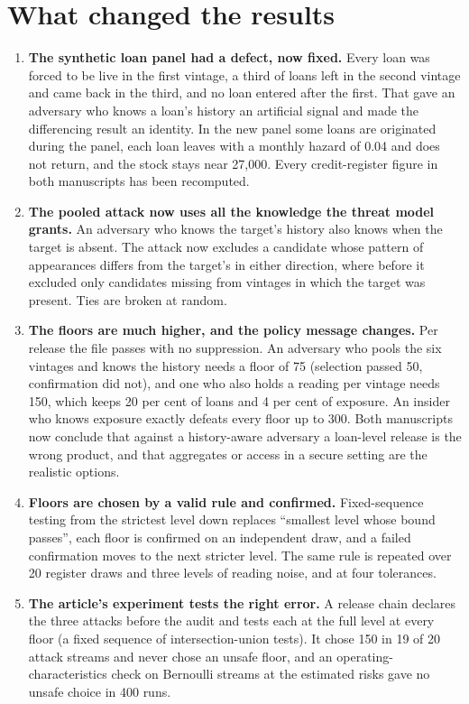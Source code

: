 \documentclass[11pt,a4paper]{article}
\begin{document}
\section*{What changed the results}
\begin{enumerate}
\item \textbf{The synthetic loan panel had a defect, now fixed.} Every loan was forced to be live in the first vintage, a third of loans left in the second vintage and came back in the third, and no loan entered after the first. That gave an adversary who knows a loan's history an artificial signal and made the differencing result an identity. In the new panel some loans are originated during the panel, each loan leaves with a monthly hazard of 0.04 and does not return, and the stock stays near 27,000. Every credit-register figure in both manuscripts has been recomputed.
\item \textbf{The pooled attack now uses all the knowledge the threat model grants.} An adversary who knows the target's history also knows when the target is absent. The attack now excludes a candidate whose pattern of appearances differs from the target's in either direction, where before it excluded only candidates missing from vintages in which the target was present. Ties are broken at random.
\item \textbf{The floors are much higher, and the policy message changes.} Per release the file passes with no suppression. An adversary who pools the six vintages and knows the history needs a floor of 75 (selection passed 50, confirmation did not), and one who also holds a reading per vintage needs 150, which keeps 20 per cent of loans and 4 per cent of exposure. An insider who knows exposure exactly defeats every floor up to 300. Both manuscripts now conclude that against a history-aware adversary a loan-level release is the wrong product, and that aggregates or access in a secure setting are the realistic options.
\item \textbf{Floors are chosen by a valid rule and confirmed.} Fixed-sequence testing from the strictest level down replaces ``smallest level whose bound passes'', each floor is confirmed on an independent draw, and a failed confirmation moves to the next stricter level. The same rule is repeated over 20 register draws and three levels of reading noise, and at four tolerances.
\item \textbf{The article's experiment tests the right error.} A release chain declares the three attacks before the audit and tests each at the full level at every floor (a fixed sequence of intersection-union tests). It chose 150 in 19 of 20 attack streams and never chose an unsafe floor, and an operating-characteristics check on Bernoulli streams at the estimated risks gave no unsafe choice in 400 runs.

\end{enumerate}
\end{document}
